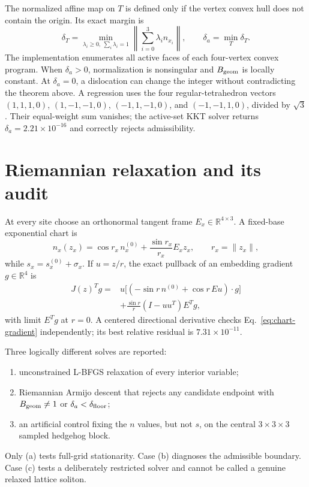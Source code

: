 \documentclass[11pt]{article}
\theoremstyle{definition}
\theoremstyle{remark}
\newcommand{\RR}{\mathbb R}
\begin{document}
The normalized affine map on $T$ is defined only if the vertex convex hull
does not contain the origin. Its exact margin is
\begin{equation}
 \delta_T=\min_{\lambda_i\ge0,\ \sum_i\lambda_i=1}
 \left\lVert\sum_{i=0}^3\lambda_i n_{x_i}\right\rVert,
 \qquad \delta_a=\min_T\delta_T.
 \label{eq:admissibility}
\end{equation}
The implementation enumerates all active faces of each four-vertex convex
program. When $\delta_a>0$, normalization is nonsingular and
$B_{\rm geom}$ is locally constant. At $\delta_a=0$, a dislocation can change
the integer without contradicting the theorem above. A regression uses the
four regular-tetrahedron vectors
$(1,1,1,0)$, $(1,-1,-1,0)$, $(-1,1,-1,0)$, and $(-1,-1,1,0)$, divided by
$\sqrt3$. Their equal-weight sum vanishes; the active-set KKT solver returns
$\delta_a=2.21\times10^{-16}$ and correctly rejects admissibility.

\section{Riemannian relaxation and its audit}

At every site choose an orthonormal tangent frame $E_x\in\RR^{4\times3}$.
A fixed-base exponential chart is
\begin{equation}
 n_x(z_x)=\cos r_x\,n_x^{(0)}
 +\frac{\sin r_x}{r_x}E_xz_x,
 \qquad r_x=\lVert z_x\rVert,
 \label{eq:chart}
\end{equation}
while $s_x=s_x^{(0)}+\sigma_x$. If $u=z/r$, the exact pullback of an
embedding gradient $g\in\RR^4$ is
\begin{align}
 J(z)^Tg={}&u\bigl[(-\sin r\,n^{(0)}+\cos r\,Eu)\cdot g\bigr]\nonumber\\
 &+\frac{\sin r}{r}(I-uu^T)E^Tg,
 \label{eq:chart-gradient}
\end{align}
with limit $E^Tg$ at $r=0$. A centered directional derivative checks
Eq.~\eqref{eq:chart-gradient} independently; its best relative residual is
$7.31\times10^{-11}$.

Three logically different solves are reported:
\begin{enumerate}[label=(\alph*)]
\item unconstrained L-BFGS relaxation of every interior variable;
\item Riemannian Armijo descent that rejects any candidate endpoint with
  $B_{\rm geom}\ne1$ or $\delta_a<\delta_{\rm floor}$;
\item an artificial control fixing the $n$ values, but not $s$, on the
  central $3\times3\times3$ sampled hedgehog block.
\end{enumerate}
Only (a) tests full-grid stationarity. Case (b) diagnoses the admissible
boundary. Case (c) tests a deliberately restricted solver and cannot be
called a genuine relaxed lattice soliton.
\end{document}
